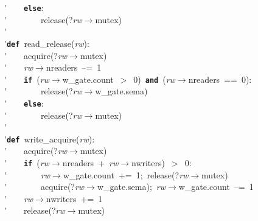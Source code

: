 \'\>~~~~\texttt{\textbf{else}}:\\

\'\>~~~~~~~~release(?\textit{rw}$\rightarrow$mutex)\\

\'\>\\

\'\>\texttt{\textbf{def}}~read\_release(\textit{rw}):\\

\'\>~~~~acquire(?\textit{rw}$\rightarrow$mutex)\\

\'\>~~~~\textit{rw}$\rightarrow$nreaders~--=~1\\

\'\>~~~~\texttt{\textbf{if}}~(\textit{rw}$\rightarrow$w\_gate.count~$>$~0)~\texttt{\textbf{and}}~(\textit{rw}$\rightarrow$nreaders~==~0):\\

\'\>~~~~~~~~release(?\textit{rw}$\rightarrow$w\_gate.sema)\\

\'\>~~~~\texttt{\textbf{else}}:\\

\'\>~~~~~~~~release(?\textit{rw}$\rightarrow$mutex)\\

\'\>~~~~\\

\'\>\texttt{\textbf{def}}~write\_acquire(\textit{rw}):\\

\'\>~~~~acquire(?\textit{rw}$\rightarrow$mutex)\\

\'\>~~~~\texttt{\textbf{if}}~(\textit{rw}$\rightarrow$nreaders~+~\textit{rw}$\rightarrow$nwriters)~$>$~0:\\

\'\>~~~~~~~~\textit{rw}$\rightarrow$w\_gate.count~+=~1;~release(?\textit{rw}$\rightarrow$mutex)\\

\'\>~~~~~~~~acquire(?\textit{rw}$\rightarrow$w\_gate.sema);~\textit{rw}$\rightarrow$w\_gate.count~--=~1\\

\'\>~~~~\textit{rw}$\rightarrow$nwriters~+=~1\\

\'\>~~~~release(?\textit{rw}$\rightarrow$mutex)\\

